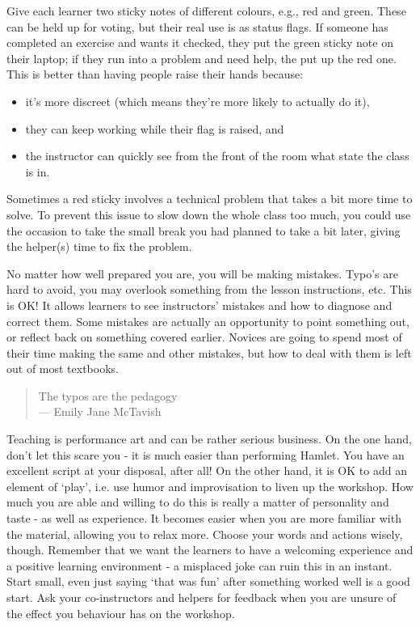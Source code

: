 
Give each learner two sticky notes of different colours, e.g., red and
green. These can be held up for voting, but their real use is as status
flags. If someone has completed an exercise and wants it checked, they
put the green sticky note on their laptop; if they run into a problem
and need help, the put up the red one. This is better than having people
raise their hands because:

\begin{itemize}
\item
  it's more discreet (which means they're more likely to actually do
  it),
\item
  they can keep working while their flag is raised, and
\item
  the instructor can quickly see from the front of the room what state
  the class is in.
\end{itemize}

Sometimes a red sticky involves a technical problem that takes a bit
more time to solve. To prevent this issue to slow down the whole class
too much, you could use the occasion to take the small break you had
planned to take a bit later, giving the helper(s) time to fix the
problem.


No matter how well prepared you are, you will be making mistakes. Typo's
are hard to avoid, you may overlook something from the lesson
instructions, etc. This is OK! It allows learners to see instructors'
mistakes and how to diagnose and correct them. Some mistakes are
actually an opportunity to point something out, or reflect back on
something covered earlier. Novices are going to spend most of their time
making the same and other mistakes, but how to deal with them is left
out of most textbooks.

\begin{quote}
The typos are the pedagogy\\--- Emily Jane McTavish
\end{quote}


Teaching is performance art and can be rather serious business. On the
one hand, don't let this scare you - it is much easier than performing
Hamlet. You have an excellent script at your disposal, after all! On the
other hand, it is OK to add an element of `play', i.e. use humor and
improvisation to liven up the workshop. How much you are able and
willing to do this is really a matter of personality and taste - as well
as experience. It becomes easier when you are more familiar with the
material, allowing you to relax more. Choose your words and actions
wisely, though. Remember that we want the learners to have a welcoming
experience and a positive learning environment - a misplaced joke can
ruin this in an instant. Start small, even just saying `that was fun'
after something worked well is a good start. Ask your co-instructors and
helpers for feedback when you are unsure of the effect you behaviour has
on the workshop.


